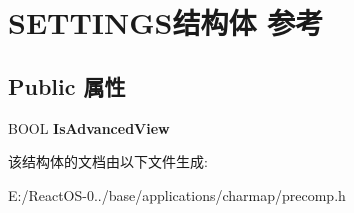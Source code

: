\hypertarget{struct_s_e_t_t_i_n_g_s}{}\section{S\+E\+T\+T\+I\+N\+G\+S结构体 参考}
\label{struct_s_e_t_t_i_n_g_s}
\subsection*{Public 属性}
\begin{DoxyCompactItemize}
\item 
\mbox{\label{struct_s_e_t_t_i_n_g_s_ae536b19001a73a8af171cac7dcad7f01}} 
B\+O\+OL {\bfseries Is\+Advanced\+View}
\end{DoxyCompactItemize}


该结构体的文档由以下文件生成\+:\begin{DoxyCompactItemize}
\item 
E\+:/\+React\+O\+S-\/0../base/applications/charmap/precomp.\+h\end{DoxyCompactItemize}
